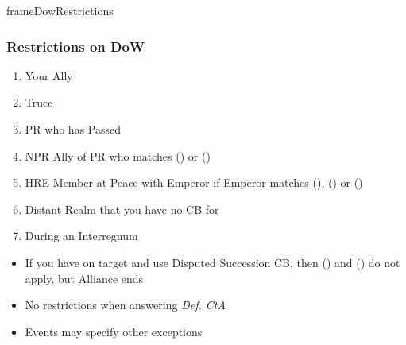 \documentclass[10pt]{article}
\newlength{\fhDowRestrictions} \setlength\fhDowRestrictions{15\baselineskip}
\begin{document}
\addbackground
\addfooter

\begin{dynamiccontents*}{frameDowRestrictions}\begin{eubox}{\fhDowRestrictions}
	\subsubsection*{Restrictions on DoW }
	\begin{enumerate}[label=\strong{\alph*}.]
		\item Your Ally
		\item Truce
		\item PR who has Passed
		\item NPR Ally of PR who matches () or ()
		\item HRE Member at Peace with Emperor if Emperor matches (), () or ()
		\item Distant Realm that you have no CB for
		\item During an Interregnum
	\end{enumerate}
	\begin{itemize}
		\item If you have \disputedsuccession on target and use Disputed Succession CB, then () and () do not apply, but Alliance ends
		\item No restrictions when answering \emph{Def. CtA}
		\item Events may specify other exceptions
	\end{itemize}
\end{eubox}\end{dynamiccontents*}
\end{document}
